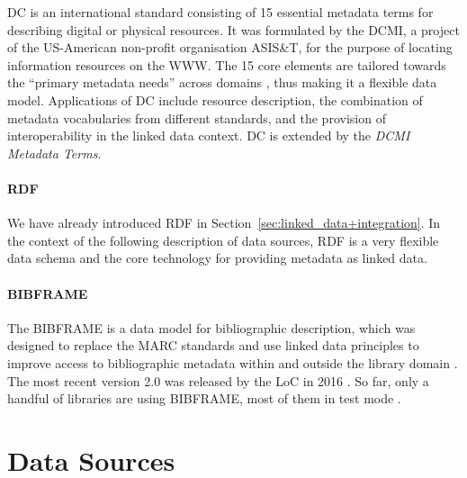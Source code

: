 \gls{DC} is an international standard consisting of 15 essential metadata terms
for describing digital or physical resources.
It was formulated by the \gls{DCMI}, a project of the US-American non-profit organisation
ASIS\&T, for the purpose of locating information resources on the \gls{WWW}.
The 15 core elements are tailored towards the \enquote{primary metadata needs} across domains
\autocite[p.215]{Hider2008}, thus making it a flexible data model.
Applications of \gls{DC} include resource description,
the combination of metadata vocabularies from different standards,
and the provision of interoperability in the linked data context.
\gls{DC} is extended by the \emph{DCMI Metadata Terms}.


\paragraph{RDF}

We have already introduced \gls{RDF} in Section~\ref{sec:linked_data+integration}.
In the context of the following description of data sources,
RDF is a very flexible data schema and the core technology for providing metadata as linked data.

\paragraph{BIBFRAME}

The \gls{BIBFRAME} is a data model for bibliographic description,
which was designed to replace the \gls{MARC} standards and use linked data principles
to improve access to bibliographic metadata within and outside the library domain \autocite{WikiBIBFRAME}.
The most recent version 2.0 was released by the \gls{LoC} in 2016 \autocite{BIBFRAME}.
So far, only a handful of libraries are using BIBFRAME,
most of them in test mode \autocite{WikiBIBFRAME}.

\section{Data Sources}
\label{sec:data_sources}

